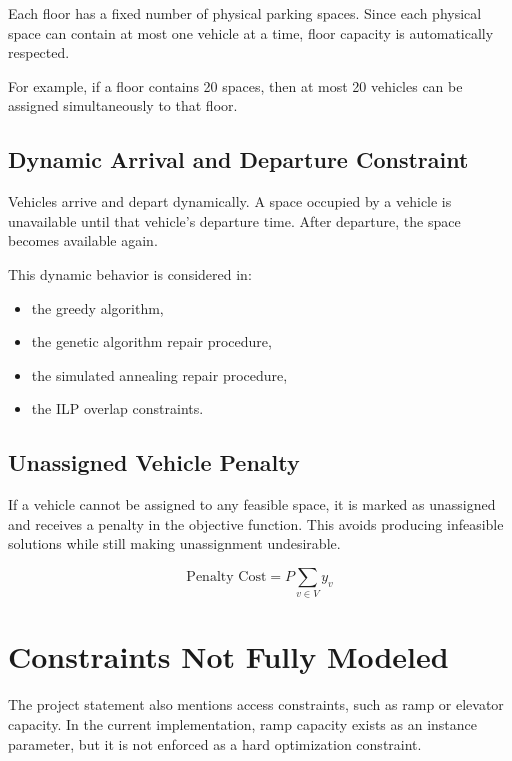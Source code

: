 \documentclass[12pt,a4paper]{article}
\begin{document}
Each floor has a fixed number of physical parking spaces. Since each physical space can contain at most one vehicle at a time, floor capacity is automatically respected.

For example, if a floor contains 20 spaces, then at most 20 vehicles can be assigned simultaneously to that floor.

\subsection{Dynamic Arrival and Departure Constraint}

Vehicles arrive and depart dynamically. A space occupied by a vehicle is unavailable until that vehicle's departure time. After departure, the space becomes available again.

This dynamic behavior is considered in:

\begin{itemize}
    \item the greedy algorithm,
    \item the genetic algorithm repair procedure,
    \item the simulated annealing repair procedure,
    \item the ILP overlap constraints.
\end{itemize}

\subsection{Unassigned Vehicle Penalty}

If a vehicle cannot be assigned to any feasible space, it is marked as unassigned and receives a penalty in the objective function. This avoids producing infeasible solutions while still making unassignment undesirable.

\begin{equation}
\text{Penalty Cost} = P \sum_{v \in V} y_v
\end{equation}

\section{Constraints Not Fully Modeled}

The project statement also mentions access constraints, such as ramp or elevator capacity. In the current implementation, ramp capacity exists as an instance parameter, but it is not enforced as a hard optimization constraint.
\end{document}
